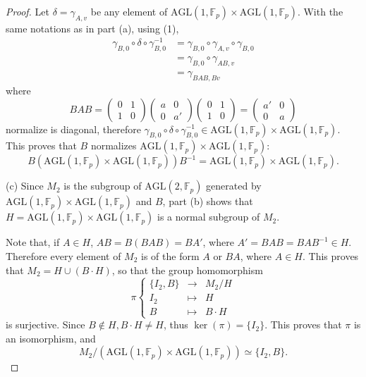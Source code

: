 \documentclass[11pt,a4paper]{article}
\newcommand{\F}{\mathbb{F}}
\begin{document}
{\begin{proof}
Let $\delta = \gamma_{A,v}$ be any element of $\mathrm{AGL}(1,\F_p) \times \mathrm{AGL}(1,\F_p)$. With the same notations as in part (a), using (1),
\begin{align*}
\gamma_{B,0} \circ \delta \circ \gamma_{B,0}^{-1} &= \gamma_{B,0} \circ \gamma_{A,v} \circ \gamma_{B,0}\\
&=\gamma_{B,0} \circ \gamma_{AB,v}\\
&=\gamma_{BAB,Bv}
\end{align*}
where 
$$
BAB = 
\begin{pmatrix}
0&1\\
1&0
\end{pmatrix}
\begin{pmatrix}
a & 0\\
0&a'
\end{pmatrix} 
\begin{pmatrix}
0&1\\
1&0
\end{pmatrix}
=
\begin{pmatrix}
a' & 0\\
0&a
\end{pmatrix} 
$$ normalize
is diagonal, therefore $\gamma_{B,0} \circ \delta \circ \gamma_{B,0}^{-1} \in \mathrm{AGL}(1,\F_p) \times \mathrm{AGL}(1,\F_p)$. This proves that $B$ normalizes $\mathrm{AGL}(1,\F_p) \times \mathrm{AGL}(1,\F_p)$: 
$$B \left(\mathrm{AGL}(1,\F_p) \times \mathrm{AGL}(1,\F_p)\right)B^{-1} = \mathrm{AGL}(1,\F_p) \times \mathrm{AGL}(1,\F_p).$$

\item[(c)] Since $M_2$ is the subgroup of $ \mathrm{AGL}(2,\F_p)$ generated by $\mathrm{AGL}(1,\F_p) \times \mathrm{AGL}(1,\F_p)$ and $B$, part (b) shows that $H = \mathrm{AGL}(1,\F_p) \times \mathrm{AGL}(1,\F_p)$ is a normal subgroup of $ M_2$.

Note that, if $A \in H$, $AB= B(BAB) = BA'$, where $A' = BAB = BAB^{-1} \in H$. Therefore every element of $M_2$ is of the form $A$ or $BA$, where $A\in H$. This proves that $M_2 = H \cup (B\cdot H)$, so that the group homomorphism
$$
\pi
\left\{
\begin{array}{ccc}
\{I_2,B\} & \to & M_2/H\\
I_2 & \mapsto& H\\
B & \mapsto & B\cdot  H
\end{array}
\right.
$$
is surjective. Since $B \not \in H, B \cdot H \ne H$, thus $\ker(\pi) = \{I_2\}$. This proves that $\pi$ is an isomorphism, and
$$M_2/ (\mathrm{AGL}(1,\F_p) \times \mathrm{AGL}(1,\F_p)) \simeq \{I_2,B\}.$$


\end{proof}}
\end{document}
